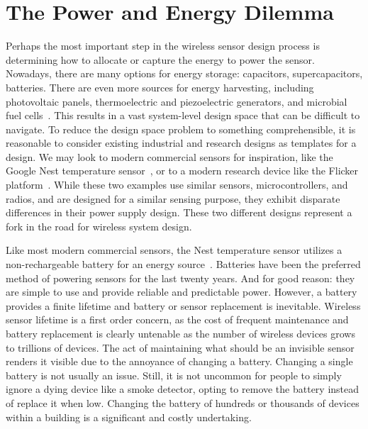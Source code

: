 \section{The Power and Energy Dilemma}
Perhaps the most important step in the wireless sensor design process is determining how to allocate or capture the energy to power the sensor. 
Nowadays, there are many options for energy storage: capacitors, supercapacitors, batteries. There are even more sources for energy harvesting, including photovoltaic panels, thermoelectric and piezoelectric generators, and microbial fuel cells~\cite{yervaGrafting12,campbellThermes14,campbell2018energy,josephson2020farming}.
This results in a vast system-level design space that can be difficult to navigate.
To reduce the design space problem to something comprehensible, it is reasonable to consider existing industrial and research designs as templates for a design.
We may look to modern commercial sensors for inspiration, like the Google Nest temperature sensor~\cite{googleNestTemperature}, or to a modern research device like the Flicker platform~\cite{hesterFlicker17}.
While these two examples use similar sensors, microcontrollers, and radios, and are designed for a similar sensing purpose, they exhibit disparate differences in their power supply design.
These two different designs represent a fork in the road for wireless system design.

Like most modern commercial sensors, the Nest temperature sensor utilizes a non-rechargeable battery for an energy source~\cite{googleNestTemperature}. 
Batteries have been the preferred method of powering sensors for the last twenty years. And for good reason: they are simple to use and provide reliable and predictable power.
However, a battery provides a finite lifetime and battery or sensor replacement is inevitable.
Wireless sensor lifetime is a first order concern, as the cost of frequent maintenance and battery replacement is clearly untenable as the number of wireless devices grows to trillions of devices. 
The act of maintaining what should be an invisible sensor renders it visible due to the annoyance of changing a battery.
Changing a single battery is not usually an issue. 
Still, it is not uncommon for people to simply ignore a dying device like a smoke detector, opting to remove the battery instead of replace it when low. 
Changing the battery of hundreds or thousands of devices within a building is a significant and costly undertaking.

